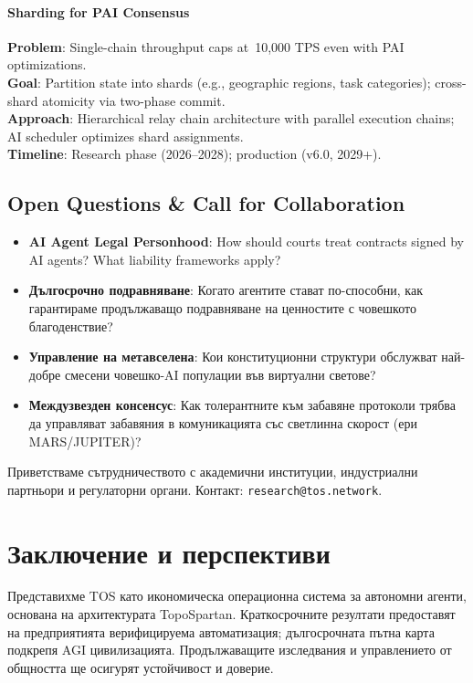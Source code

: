 \documentclass[11pt]{article}
\begin{document}
\paragraph{Sharding for PAI Consensus}
\textbf{Problem}: Single-chain throughput caps at~10,000 TPS even with PAI optimizations.\\
\textbf{Goal}: Partition state into shards (e.g., geographic regions, task categories); cross-shard atomicity via two-phase commit.\\
\textbf{Approach}: Hierarchical relay chain architecture with parallel execution chains; AI scheduler optimizes shard assignments.\\
\textbf{Timeline}: Research phase (2026--2028); production (v6.0, 2029+).

\subsection{Open Questions \& Call for Collaboration}

\begin{itemize}[noitemsep]
  \item \textbf{AI Agent Legal Personhood}: How should courts treat contracts signed by AI agents? What liability frameworks apply?
  \item \textbf{Дългосрочно подравняване}: Когато агентите стават по-способни, как гарантираме продължаващо подравняване на ценностите с човешкото благоденствие?
  \item \textbf{Управление на метавселена}: Кои конституционни структури обслужват най-добре смесени човешко-AI популации във виртуални светове?
  \item \textbf{Междузвезден консенсус}: Как толерантните към забавяне протоколи трябва да управляват забавяния в комуникацията със светлинна скорост (ери MARS/JUPITER)?
\end{itemize}

Приветстваме сътрудничеството с академични институции, индустриални партньори и регулаторни органи. Контакт: \texttt{research@tos.network}.

\section{Заключение и перспективи}
Представихме TOS като икономическа операционна система за автономни агенти, основана на архитектурата TopoSpartan. Краткосрочните резултати предоставят на предприятията верифицируема автоматизация; дългосрочната пътна карта подкрепя AGI цивилизацията. Продължаващите изследвания и управлението от общността ще осигурят устойчивост и доверие.
\end{document}
